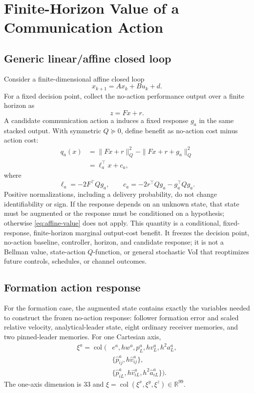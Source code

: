 \documentclass[10pt,twocolumn,twoside]{IEEEtran}
\DeclareMathOperator{\col}{col}
\begin{document}
\section{Finite-Horizon Value of a Communication Action}

\subsection{Generic linear/affine closed loop}

Consider a finite-dimensional affine closed loop
\begin{equation}
x_{k+1}=Ax_k+Bu_k+d.
\end{equation}
For a fixed decision point, collect the no-action performance output over a
finite horizon as
\begin{equation}
z=Fx+r.
\label{eq:baseline}
\end{equation}
A candidate communication action a induces a fixed response \(g_a\) in the
same stacked output.  With symmetric \(Q\succeq0\), define benefit as
no-action cost minus action cost:
\begin{align}
q_a(x)&=\|Fx+r\|_Q^2-\|Fx+r+g_a\|_Q^2\nonumber\\
&=\ell_a^\top x+c_a,
\label{eq:affine-value}
\end{align}
where
\begin{equation}
\ell_a=-2F^\top Qg_a,\qquad
c_a=-2r^\top Qg_a-g_a^\top Qg_a.
\label{eq:value-coeff}
\end{equation}
Positive normalizations, including a delivery probability, do not change
identifiability or sign.  If the response depends on an unknown state, that
state must be augmented or the response must be conditioned on a hypothesis;
otherwise \eqref{eq:affine-value} does not apply.
This quantity is a conditional, fixed-response, finite-horizon marginal
output-cost benefit.  It freezes the decision point, no-action baseline,
controller, horizon, and candidate response; it is not a Bellman value,
state-action \(Q\)-function, or general stochastic VoI that reoptimizes future
controls, schedules, or channel outcomes.

\subsection{Formation action response}

For the formation case, the augmented state contains exactly the variables
needed to construct the frozen no-action response: follower formation error
and scaled relative velocity, analytical-leader state, eight ordinary
receiver memories, and two pinned-leader memories.  For one Cartesian axis,
\begin{equation}
\begin{aligned}
\xi^a=\col\!\big(&e^a,hw^a,p_L^a,hv_L^a,h^2a_L^a,\\
&\{\hat p_{ij}^a,h\hat v_{ij}^a\},\\
&\{\hat p_{iL}^a,h\hat v_{iL}^a,h^2\hat a_{iL}^a\}\big).
\end{aligned}
\label{eq:aug-state}
\end{equation}
The one-axis dimension is 33 and
\(\xi=\col(\xi^x,\xi^y,\xi^z)\in\mathbb R^{99}\).
\end{document}
